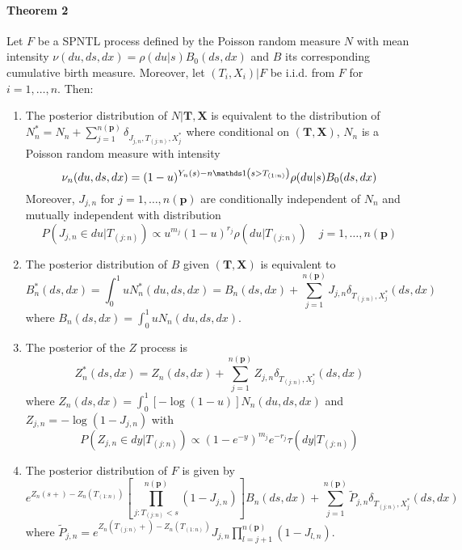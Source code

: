 \paragraph{Theorem 2} Let $F$ be a SPNTL process defined by the Poisson random measure $N$ with mean intensity $\nu(du, ds, dx) = \rho(du | s)B_0(ds, dx)$ and $B$ its corresponding cumulative birth measure. Moreover, let $(T_i, X_i)|F$ be i.i.d. from $F$ for $i = 1, \ldots, n$. Then:
\begin{enumerate}
	\item The posterior distribution of $N|\boldsymbol{T}, \boldsymbol{X}$ is equivalent to the distribution of $N_n^* = N_n + \sum_{j=1}^{n(\boldsymbol{p})} \delta_{J_{j,n}, T_{(j:n)}, X_j^*}$ where conditional on $(\boldsymbol{T}, \boldsymbol{X})$, $N_n$ is a Poisson random measure with intensity
	\begin{equation*}
	\nu_n(du,ds,dx) = (1-u)^{Y_n(s) - n\indicator\left(s > T_{(1:n)}\right)}\rho(du|s)B_0(ds, dx)
	\end{equation*}
	Moreover, $J_{j,n}$ for $j=1, \ldots, n(\boldsymbol{p})$ are conditionally independent of $N_n$ and mutually independent with distribution
	\begin{equation*}
	P\left(J_{j,n} \in du | T_{(j:n)}\right) \propto u^{m_j}(1-u)^{r_j}\rho\left(du|T_{(j:n)}\right) \quad j=1, \ldots, n(\boldsymbol{p})
	\end{equation*}
	\item The posterior distribution of $B$ given $(\boldsymbol{T}, \boldsymbol{X})$ is equivalent to 
	\begin{equation*}
	B_n^*(ds, dx) = \int_0^1 u N_n^*(du,ds,dx) = B_n(ds,dx) + \sum_{j=1}^{n(\boldsymbol{p})} J_{j,n} \delta_{T_{(j:n)}, X_j^*}(ds,dx)
	\end{equation*}
	where $B_n(ds,dx) = \int_0^1 u N_n(du,ds,dx)$.
	\item The posterior of the $Z$ process is 
	\begin{equation*}
	Z_n^*(ds, dx) = Z_n(ds,dx) + \sum_{j=1}^{n(\boldsymbol{p})} Z_{j,n} \delta_{T_{(j:n)}, X_j^*}(ds,dx)
	\end{equation*}
	where $Z_n(ds,dx) = \int_0^1 [-\log(1-u)] N_n(du,ds,dx)$ and $Z_{j,n} = -\log(1-J_{j,n})$ with
	\begin{equation*}
	P(Z_{j,n} \in dy|T_{(j:n)}) \propto  (1-e^{-y})^{m_j}e^{-r_j}\tau\left(dy|T_{(j:n)}\right)
	\end{equation*}
	\item The posterior distribution of $F$ is given by
	\begin{equation*}
	e^{Z_n(s+) - Z_n\left(T_{(1:n)}\right)}\left[\prod_{j: T_{(j:n)} < s}^{n(\boldsymbol{p})} (1 - J_{j,n})\right] B_n(ds, dx) + \sum_{j=1}^{n(\boldsymbol{p})} \tilde{P}_{j,n}\delta_{T_{(j:n)}, X_j^*}(ds,dx)
	\end{equation*}
	where $\tilde{P}_{j,n} = e^{Z_n(T_{(j:n)}+) - Z_n\left(T_{(1:n)}\right)} J_{j,n}\prod_{l=j+1}^{n(\boldsymbol{p})}(1- J_{l,n})$.
\end{enumerate}

